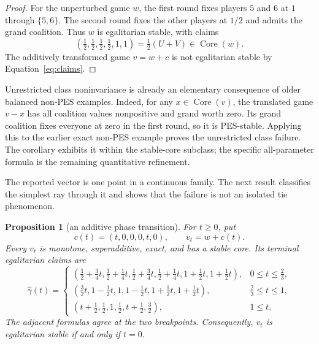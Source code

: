 \documentclass[11pt]{article}
\newtheorem{proposition}[theorem]{Proposition}
\newcommand{\core}{\operatorname{Core}}
\begin{document}
\begin{proof}
For the unperturbed game $w$, the first round fixes players $5$ and $6$ at
$1$ through $\{5,6\}$. The second round fixes the other players at $1/2$ and
admits the grand coalition. Thus $w$ is egalitarian stable, with claims
\[
 \left(\tfrac12,\tfrac12,\tfrac12,\tfrac12,1,1\right)
   =\tfrac12(U+V)\in\core(w).
\]
The additively transformed game $v=w+c$ is not egalitarian stable by
Equation~\eqref{eq:claims}.
\end{proof}

Unrestricted class noninvariance is already an elementary consequence of
older balanced non-PES examples. Indeed, for any $x\in\core(v)$, the
translated game $v-x$ has all coalition values nonpositive and grand worth
zero. Its grand coalition fixes everyone at zero in the first round, so it
is PES-stable. Applying this to the earlier exact non-PES example
\citep{Mauri2017} proves the unrestricted class failure. The corollary
exhibits it within the stable-core subclass; the specific all-parameter
formula is the remaining quantitative refinement.

The reported vector is one point in a continuous family.  The next result
classifies the simplest ray through it and shows that the failure is not an
isolated tie phenomenon.

\begin{proposition}[an additive phase transition]\label{prop:additive-ray}
For $t\geq0$, put
\[
 c(t)=(t,0,0,0,t,0),\qquad v_t=w+c(t).
\]
Every $v_t$ is monotone, superadditive, exact, and has a stable core.  Its
terminal egalitarian claims are
\[
\widehat\gamma(t)=
\begin{cases}
 (\frac12+\frac34t,\frac12+\frac14t,
  \frac12+\frac34t,\frac12+\frac14t,1+\frac12t,1+\frac12t),
   &0\leq t\leq\frac23,\\[2pt]
 (\frac32t,1-\frac12t,1,1-\frac12t,
  1+\frac12t,1+\frac12t),
   &\frac23\leq t\leq1,\\[2pt]
 (t+\frac12,\frac12,1,\frac12,t+\frac12,\frac32),
   &1\leq t.
\end{cases}
\]
The adjacent formulas agree at the two breakpoints.  Consequently, $v_t$ is
egalitarian stable if and only if $t=0$.
\end{proposition}
\end{document}
